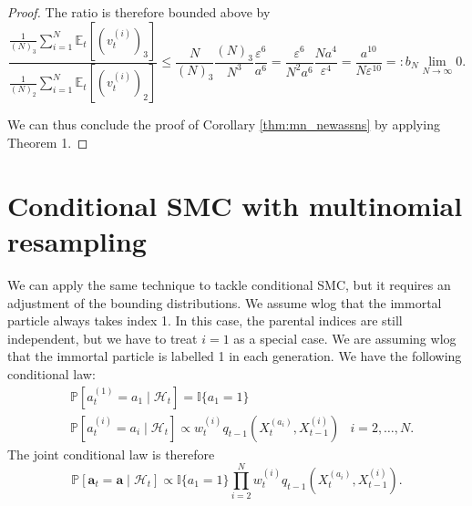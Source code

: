 \documentclass[fleqn]{article}
\theoremstyle{definition}
\newcommand{\PR}{\mathbb{P}}
\newcommand{\E}{\mathbb{E}}
\newcommand{\I}[1]{\mathbb{I}\{#1\}}
\newcommand{\1}[1]{\mathbbm{1}_{\{#1\}}}
\newcommand{\limNtoinfty}{\underset{N\to\infty}{\lim}}
\newcommand{\vt}[2][t]{v_{#1}^{(#2)}}
\newcommand{\wt}[2][t]{w_{#1}^{(#2)}}
\begin{document}
\begin{proof}
The ratio is therefore bounded above by
\begin{equation*}
\frac{\frac{1}{(N)_3} \sum_{i=1}^N \E_t[(\vt{i})_3]}{\frac{1}{(N)_2} \sum_{i=1}^N \E_t[(\vt{i})_2]}
\leq \frac{N}{(N)_3} \frac{(N)_3}{N^3}\frac{\varepsilon^6}{a^6}
= \frac{\varepsilon^6}{N^2a^6} \frac{Na^4}{\varepsilon^4} = \frac{a^{10}}{N\varepsilon^{10}} =: b_N \limNtoinfty 0.
\end{equation*}

We can thus conclude the proof of Corollary \ref{thm:mn_newassns} by applying Theorem 1.
\end{proof}


\section*{Conditional SMC with multinomial resampling}
We can apply the same technique to tackle conditional SMC, but it requires an adjustment of the bounding distributions.
We assume wlog that the immortal particle always takes index 1.
In this case, the parental indices are still independent, but we have to treat $i=1$ as a special case. We are assuming wlog that the immortal particle is labelled 1 in each generation. We have the following conditional law:
\begin{align*}
&\PR [a_t^{(1)} = a_1 \mid \mathcal{H}_t] = \I{a_1=1}  & \\
&\PR [a_t^{(i)} = a_i \mid \mathcal{H}_t] \propto \wt{i} q_{t-1}(X_t^{(a_i)}, X_{t-1}^{(i)}) & i=2,\dots,N .
\end{align*}
The joint conditional law is therefore
\begin{equation*}
\PR [\mathbf{a}_t = \mathbf{a} \mid \mathcal{H}_t] \propto \I{a_1 = 1} \prod_{i=2}^N \wt{i} q_{t-1}(X_t^{(a_i)}, X_{t-1}^{(i)}).
\end{equation*}
\end{document}
